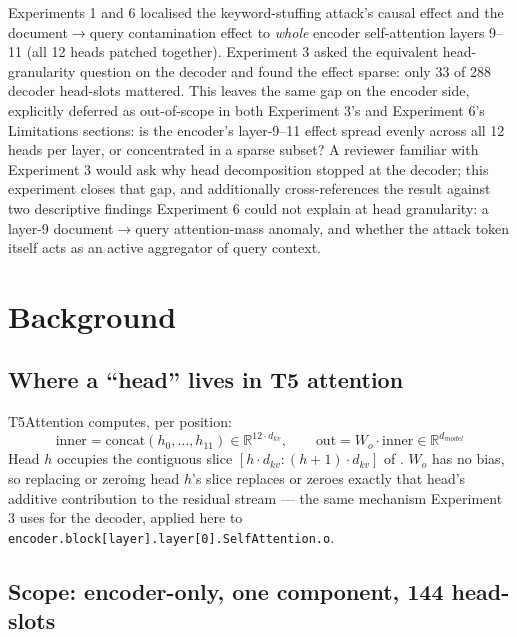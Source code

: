 \documentclass[11pt]{article}
\begin{document}
Experiments 1 and 6 localised the keyword-stuffing attack's causal effect and the
document$\to$query contamination effect to \emph{whole} encoder self-attention layers
9--11 (all 12 heads patched together). Experiment 3 asked the equivalent
head-granularity question on the decoder and found the effect sparse: only 33 of 288
decoder head-slots mattered. This leaves the same gap on the encoder side, explicitly
deferred as out-of-scope in both Experiment 3's and Experiment 6's Limitations sections:
is the encoder's layer-9--11 effect spread evenly across all 12 heads per layer, or
concentrated in a sparse subset? A reviewer familiar with Experiment 3 would ask why head
decomposition stopped at the decoder; this experiment closes that gap, and additionally
cross-references the result against two descriptive findings Experiment 6 could not
explain at head granularity: a layer-9 document$\to$query attention-mass anomaly, and
whether the attack token itself acts as an active aggregator of query context.

\section{Background}

\subsection{Where a ``head'' lives in T5 attention}

T5Attention computes, per position:
\begin{equation}
\text{inner} = \text{concat}(h_0, \dots, h_{11}) \in \mathbb{R}^{12 \cdot d_{kv}}, \qquad
\text{out} = W_o \cdot \text{inner} \in \mathbb{R}^{d_{model}}
\label{eq:headconcat}
\end{equation}
Head $h$ occupies the contiguous slice $[h \cdot d_{kv} : (h{+}1) \cdot d_{kv}]$ of
. $W_o$ has no bias, so replacing or zeroing head $h$'s slice replaces or
zeroes exactly that head's additive contribution to the residual stream — the same
mechanism Experiment 3 uses for the decoder, applied here to
\texttt{encoder.block[layer].layer[0].SelfAttention.o}.

\subsection{Scope: encoder-only, one component, 144 head-slots}
\end{document}
